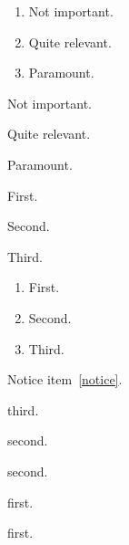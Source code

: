\documentclass{article}
\begin{document}
\begin{enumerate}
\item Not important.
\item Quite relevant.
\item Paramount.
\end{enumerate}

\begin{etaremune}
\item Not important.
\item Quite relevant.
\item Paramount.
\end{etaremune}

\begin{etaremune}[start=5]
\item First.
\item Second.
\item Third.
\end{etaremune}

\renewcommand{\labelenumi}{\theenumi)}
\renewcommand{\theenumii}{\roman{enumii}}
\begin{enumerate}
\item First.
\item Second.
\item Third.
\end{enumerate}
Notice item~\ref{notice}.

\begin{etaremune}[itemsep=0pt,parsep=0pt]
\item third.
\item second.
\begin{etaremune}
\item second.
\item first.
\end{etaremune}
\item first.
\end{etaremune}
\end{document}
